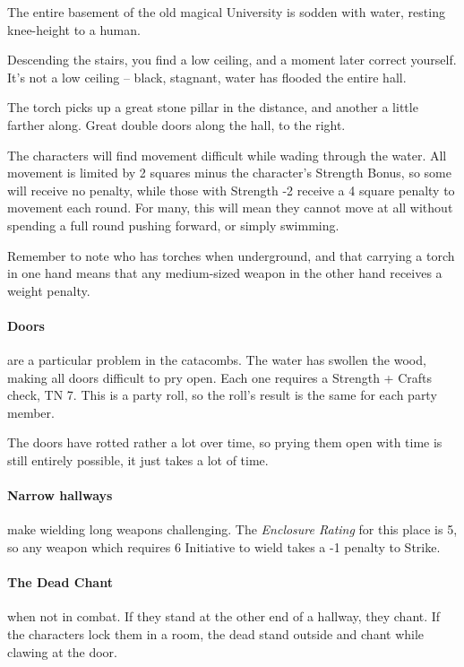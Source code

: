 \begin{multicols}{2}
The entire basement of the old magical University is sodden with water, resting knee-height to a human.

\begin{boxtext}
  Descending the stairs, you find a low ceiling, and a moment later correct yourself.  It's not a low ceiling -- black, stagnant, water has flooded the entire hall.

  The torch picks up a great stone pillar in the distance, and another a little farther along.
  Great double doors along the hall, to the right.

\end{boxtext}

The characters will find movement difficult while wading through the water.  All movement is limited by 2 squares minus the character's Strength Bonus, so some will receive no penalty, while those with Strength -2 receive a 4 square penalty to movement each round.  For many, this will mean they cannot move at all without spending a full round pushing forward, or simply swimming.

Remember to note who has torches when underground, and that carrying a torch in one hand means that any medium-sized weapon in the other hand receives a weight penalty.

\paragraph{Doors} are a particular problem in the catacombs.  The water has swollen the wood, making all doors difficult to pry open.  Each one requires a Strength + Crafts check, TN 7.  This is a party roll, so the roll's result is the same for each party member.

The doors have rotted rather a lot over time, so prying them open with time is still entirely possible, it just takes a lot of time.

\paragraph{Narrow hallways}
make wielding long weapons challenging.
The \textit{Enclosure Rating} for this place is 5, so any weapon which requires 6 Initiative to wield takes a -1 penalty to Strike.

\paragraph{The Dead Chant} when not in combat.
If they stand at the other end of a hallway, they chant.
If the characters lock them in a room, the dead stand outside and chant while clawing at the door.


\end{multicols}
